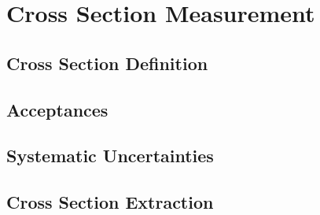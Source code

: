 \graphicspath{{Chapters/CrossSection/Figures/}}
\chapter{Cross Section Measurement}
\label{chap:Cross Section Measurements}

\section{Cross Section Definition}
\section{Acceptances}
\section{Systematic Uncertainties}
\section{Cross Section Extraction}
